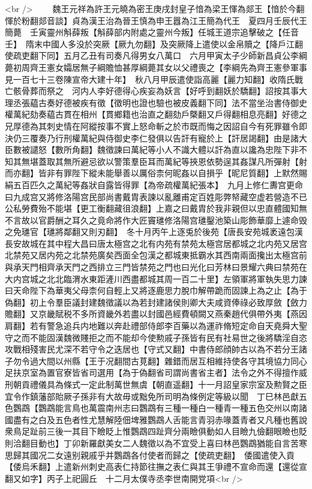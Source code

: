 <br />
　　魏王元祥為許王元曉為密王庚戌封皇子愔為梁王惲為郯王【愔於今翻惲於粉翻郯音談】貞為漢王治為晉王慎為申王囂為江王簡為代王　夏四月壬辰代王簡薨　壬寅靈州斛薛叛【斛薛部内附處之靈州今叛】任城王道宗追擊破之【任音壬】　隋末中國人多没於突厥【厥九勿翻】及突厥降上遣使以金帛贖之【降戶江翻使疏吏翻下同】五月乙丑有司奏凡得男女八萬口　六月甲寅太子少師新昌貞公李綱薨初周齊王憲女孀居無子綱贍恤甚厚綱薨其女以父禮喪之【李綱先為齊王憲參軍事見一百七十三卷陳宣帝大建十年】　秋八月甲辰遣使詣高麗【麗力知翻】收隋氏戰亡骸骨葬而祭之　河内人李好德得心疾妄為妖言【好呼到翻妖於驕翻】詔按其事大理丞張藴古奏好德被疾有徵【徵明也證也驗也被皮義翻下同】法不當坐治書侍御史權萬紀劾奏藴古貫在相州【貫鄉籍也治直之翻劾戶槩翻又戶得翻相息亮翻】好德之兄厚德為其刺史情在阿縱按事不實上怒命斬之於市既而悔之因詔自今有死罪雖令即決仍三覆奏乃行刑權萬紀與侍御史李仁發俱以告訐有寵於上【訐居謁翻】由是諸大臣數被譴怒【數所角翻】魏徵諫曰萬紀等小人不識大體以訐為直以讒為忠陛下非不知其無堪蓋取其無所避忌欲以警策羣臣耳而萬紀等挾恩依勢逞其姦謀凡所彈射【射而亦翻】皆非有罪陛下縱未能舉善以厲俗柰何昵姦以自損乎【昵尼質翻】上默然賜絹五百匹久之萬紀等姦狀自露皆得罪【為帝疏權萬紀張本】　九月上修仁夀宫更命曰九成宫又將修洛陽宫民部尚書戴胄表諫以亂離甫定百姓彫弊帑藏空虚若營造不已公私勞費殆不能堪【更工衡翻藏徂浪翻】上嘉之曰戴胄於我非親但以忠直體國知無不言故以官爵酬之耳久之竟命將作大匠竇璡修洛陽宫璡鑿池築山彫飾華靡上遽命毁之免璡官【璡將鄰翻又則刃翻】　冬十月丙午上逐兎於後苑【唐長安苑城袤遠包漢長安故城在其中程大昌曰唐太極宫之北有内苑有禁苑太極宫居都城之北内苑又居宫北禁苑又居内苑之北禁苑廣矣西面全包漢之都城東抵霸水其西南兩面攙出太極宫前與承天門相齊承天門之西排立三門皆禁苑之門也曰光化曰芳林曰景耀六典曰禁苑在大内宫城之北北臨渭水東距滻川西盡都城其周一百二十里】左領軍將軍執失思力諫曰天命陛下為華夷父母柰何自輕上又將逐鹿思力脫巾解帶跪而固諫上為之止【為于偽翻】初上令羣臣議封建魏徵議以為若封建諸侯則卿大夫咸資俸祿必致厚斂【斂力贍翻】又京畿賦税不多所資畿外若盡以封國邑經費頓闕又燕秦趙代俱帶外夷【燕因肩翻】若有警急追兵内地難以奔赴禮部侍郎李百藥以為運祚脩短定命自天堯舜大聖守之而不能固漢魏微賤拒之而不能却今使勲戚子孫皆有民有社易世之後將驕淫自恣攻戰相殘害民尤深不若守令之迭居也【守式又翻】中書侍郎顔帥古以為不若分王諸子勿令過大間以州縣【王于况翻間古莧翻】雜錯而居互相維持使各守其境協力同心足扶京室為置官寮皆省司選用【為于偽翻省司謂尚書省主者】法令之外不得擅作威刑朝貢禮儀具為條式一定此制萬世無虞【朝直遥翻】十一月詔皇家宗室及勲賢之臣宜令作鎮藩部貽厥子孫非有大故毋或黜免所司明為條例定等級以聞　丁巳林邑獻五色鸚鵡【鸚鵡能言鳥也萬震南州志曰鸚鵡有三種一種白一種青一種五色交州以南諸國盡有之白及五色者性尤慧解陸佃埤雅鸚鵡人舌能言青羽赤喙蓋青者又凡種也舊說衆鳥足趾前三後一其目下瞼眨上惟鸚鵡四趾齊分兩瞼俱動如人目瞼九儉翻眼瞼也貶則洽翻目動也】丁卯新羅獻美女二人魏徵以為不宜受上喜曰林邑鸚鵡猶能自言苦寒思歸其國况二女遠别親戚乎并鸚鵡各付使者而歸之【使疏吏翻】　倭國遣使入貢【倭烏禾翻】上遣新州刺史高表仁持節往撫之表仁與其王爭禮不宣命而還【還從宣翻又如字】丙子上祀圓丘　十二月太僕寺丞李世南開党項<br />
